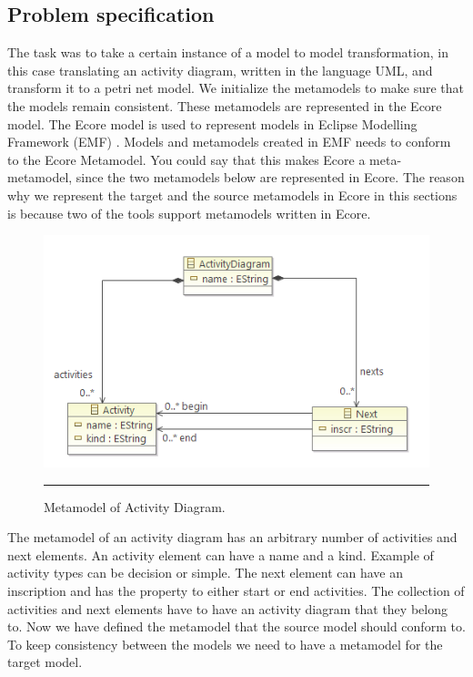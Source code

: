 \subsection{Problem specification}
\noindent The task was to take a certain instance of a model to model
transformation, in this case translating an activity diagram, written in the
language UML, and transform it to a petri net model. We initialize the
metamodels to make sure that the models remain consistent. These metamodels are
represented in the Ecore model\cite{Steinberg2009}. The Ecore model is used to
represent models in Eclipse Modelling Framework (EMF) \cite{Steinberg2009}.
Models and metamodels created in EMF needs to conform to the Ecore Metamodel.
You could say that this makes Ecore a meta-metamodel, since the two metamodels
below are represented in Ecore. The reason why we represent the target and the
source metamodels in Ecore in this sections is because two of the tools support
metamodels written in Ecore.

\begin{figure}[htbp]
  \centering
    \includegraphics[scale=0.5]{./Figures/ActivityMetamodel.png}
    \rule{35em}{0.5pt}
  \caption[Metamodel of Activity Diagram]{Metamodel of Activity Diagram.}
  \label{fig:ActivityMetamodel}
\end{figure}

The metamodel of an activity diagram has an arbitrary number of activities and
next elements. An activity element can have a name and a kind. Example of
activity types can be decision or simple. The next element can have an
inscription and has the property to either start or end activities. The
collection of activities and next elements have to have an activity diagram
that they belong to. Now we have defined the metamodel that the source model
should conform to. To keep consistency between the models we need to have a
metamodel for the target model.

